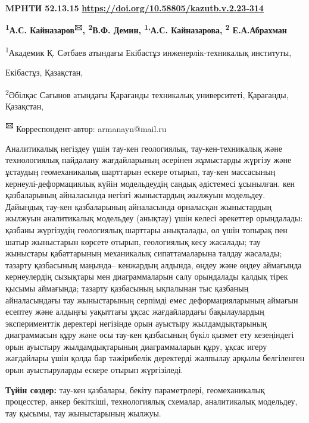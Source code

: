 \newpage
{\bfseries MPHTИ 52.13.15}
\hfill {\bfseries \href{https://doi.org/10.58805/kazutb.v.2.23-314}{https://doi.org/10.58805/kazutb.v.2.23-314}}


\begin{center}
{\bfseries \textsuperscript{1}А.С. Кайназаров\textsuperscript{🖂},
\textsuperscript{2}В.Ф. Демин, \textsuperscript{1,}А.С. Кайназарова,
\textsuperscript{2} Е.А.Абрахман}

\textsuperscript{1}Академик Қ. Сәтбаев атындағы Екібастұз
инженерлік-техникалық институты,

Екібастұз, Қазақстан,

\textsuperscript{2}Әбілқас Сағынов атындағы Қарағанды техникалық
университеті, Қарағанды, Қазақстан,

{\bfseries \textsuperscript{🖂}} Корреспондент-автор: armanayn@mail.ru
\end{center}

Аналитикалық негіздеу үшін тау-кен геологиялық, тау-кен-техникалық және
технологиялық пайдалану жағдайларының әсерінен жұмыстарды жүргізу және
ұстаудың геомеханикалық шарттарын ескере отырып, тау-кен массасының
кернеулі-деформациялық күйін модельдеудің сандық әдістемесі ұсынылған.
кен қазбаларының айналасында негізгі жыныстардың жылжуын модельдеу.
Дайындық тау-кен қазбаларының айналасында орналасқан жыныстардың жылжуын
аналитикалық модельдеу (анықтау) үшін келесі әрекеттер орындалады:
қазбаны жүргізудің геологиялық шарттары анықталады, ол үшін топырақ пен
шатыр жыныстарын көрсете отырып, геологиялық кесу жасалады; тау
жыныстары қабаттарының механикалық сипаттамаларына талдау жасалады;
тазарту қазбасының маңында-- кенжардың алдында, өңдеу және өңдеу
аймағында кернеулердің сызықтары мен диаграммаларын салу орындалады
қалдық тірек қысымы аймағында; тазарту қазбасының ықпалынан тыс қазбаның
айналасындағы тау жыныстарының серпімді емес деформацияларының аймағын
есептеу және алдыңғы уақыттағы ұқсас жағдайлардағы бақылаулардың
эксперименттік деректері негізінде орын ауыстыру жылдамдықтарының
диаграммасын құру және осы тау-кен қазбасының бүкіл қызмет ету
кезеңіндегі орын ауыстыру жылдамдықтарының диаграммаларын құру, ұқсас
игеру жағдайлары үшін қолда бар тәжірибелік деректерді жалпылау арқылы
белгіленген орын ауыстыруларды ескере отырып жүргізіледі.

{\bfseries Түйін сөздер:} тау-кен қазбалары, бекіту параметрлері,
геомеханикалық процесстер, анкер бекіткіші, технологиялық схемалар,
аналитикалық модельдеу, тау қысымы, тау жыныстарының жылжуы.

